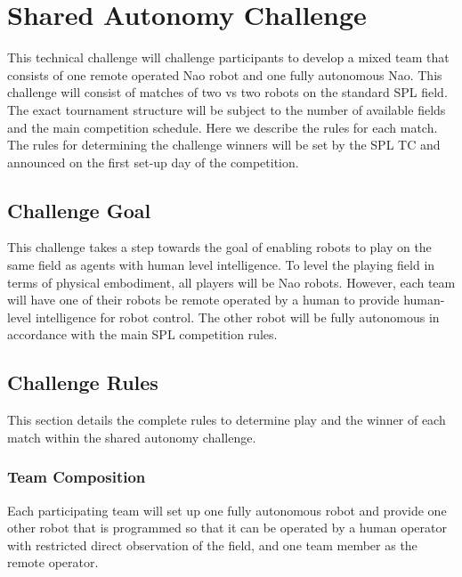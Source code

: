 \section{Shared Autonomy Challenge}

This technical challenge will challenge participants to develop a mixed team that consists of one remote operated Nao robot and one fully autonomous Nao. This challenge will consist of matches of two vs two robots on the standard SPL field. The exact tournament structure will be subject to the number of available fields and the main competition schedule. Here we describe the rules for each match. The rules for determining the challenge winners will be set by the SPL TC and announced on the first set-up day of the competition.

\subsection{Challenge Goal}

This challenge takes a step towards the goal of enabling robots to play on the same field as agents with human level intelligence. To level the playing field in terms of physical embodiment, all players will be Nao robots. However, each team will have one of their robots be remote operated by a human to provide human-level intelligence for robot control. The other robot will be fully autonomous in accordance with the main SPL competition rules.

\subsection{Challenge Rules}

This section details the complete rules to determine play and the winner of each match within the shared autonomy challenge.

\subsubsection{Team Composition}
Each participating team will set up one fully autonomous robot and provide one other robot that is programmed so that it can be operated by a human operator with restricted direct observation of the field, and one team member as the remote operator.

